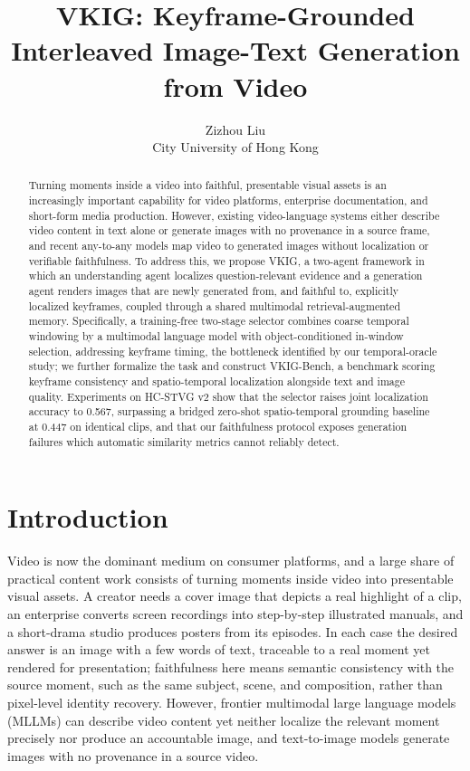 \documentclass[10pt]{article}
\begin{document}
\title{VKIG: Keyframe-Grounded Interleaved Image-Text Generation from Video}
\author{Zizhou Liu\\City University of Hong Kong}
\date{}

\maketitle

\begin{abstract}
Turning moments inside a video into faithful, presentable visual assets is an
increasingly important capability for video platforms, enterprise
documentation, and short-form media production.
However, existing video-language systems either describe video content in text
alone or generate images with no provenance in a source frame, and recent
any-to-any models map video to generated images without localization or
verifiable faithfulness.
To address this, we propose VKIG, a two-agent framework in which an
understanding agent localizes question-relevant evidence and a generation
agent renders images that are newly generated from, and faithful to,
explicitly localized keyframes, coupled through a shared multimodal
retrieval-augmented memory.
Specifically, a training-free two-stage selector combines coarse temporal
windowing by a multimodal language model with object-conditioned in-window
selection, addressing keyframe timing, the bottleneck identified by our
temporal-oracle study; we further formalize the task and construct
VKIG-Bench, a benchmark scoring keyframe consistency and spatio-temporal
localization alongside text and image quality.
Experiments on HC-STVG v2 show that the selector raises joint localization
accuracy to 0.567, surpassing a bridged zero-shot spatio-temporal grounding
baseline at 0.447 on identical clips, and that our faithfulness protocol
exposes generation failures which automatic similarity metrics cannot
reliably detect.
\end{abstract}

\section{Introduction}\label{sec:intro}

Video is now the dominant medium on consumer platforms, and a large share of
practical content work consists of turning moments inside video into
presentable visual assets.
A creator needs a cover image that depicts a real highlight of a clip, an
enterprise converts screen recordings into step-by-step illustrated manuals,
and a short-drama studio produces posters from its episodes.
In each case the desired answer is an image with a few words of text,
traceable to a real moment yet rendered for presentation; faithfulness here
means semantic consistency with the source moment, such as the same subject,
scene, and composition, rather than pixel-level identity recovery.
However, frontier multimodal large language models (MLLMs) can describe video
content yet neither localize the relevant moment precisely nor produce an
accountable image, and text-to-image models generate images with no
provenance in a source video.
\end{document}
